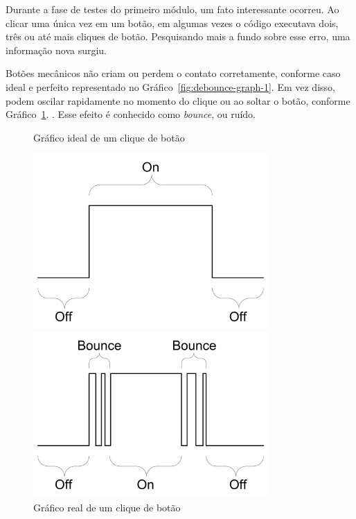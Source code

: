 \documentclass[
		12pt,				%
		openright,			%
		oneside,			%
		a4paper,			%
		chapter=TITLE,		%
		english,			%
		brazil				%
	]{abntex2}
\begin{document}
Durante a fase de testes do primeiro módulo, um fato interessante ocorreu. Ao clicar uma única vez em um botão, em algumas vezes o código executava dois, três ou até mais cliques de botão. Pesquisando mais a fundo sobre esse erro, uma informação nova surgiu. 

Botões mecânicos não criam ou perdem o contato corretamente, conforme caso ideal e perfeito representado no Gráfico~\ref{fig:debounce-graph-1}. Em vez disso, podem oscilar rapidamente no momento do clique ou ao soltar o botão, conforme Gráfico~\ref{fig:debounce-graph-2}. \cite{debounce-graph}. Esse efeito é conhecido como \textit{bounce}, ou ruído.

\begin{figure}[htb]
	\centering
 	\begin{minipage}{0.45\textwidth}
		\centering
		\caption{\label{fig:debounce-graph-1}Gráfico ideal de um clique de botão}
		\includegraphics[width=0.8\textwidth]{img/debounce-graph-1.jpg}
	\end{minipage}
	\hfill
	\begin{minipage}{0.45\textwidth}
		\centering
		\caption{\label{fig:debounce-graph-2}Gráfico real de um clique de botão}
		\includegraphics[width=0.8\textwidth]{img/debounce-graph-2.jpg}
	\end{minipage}
\end{figure}
\end{document}
